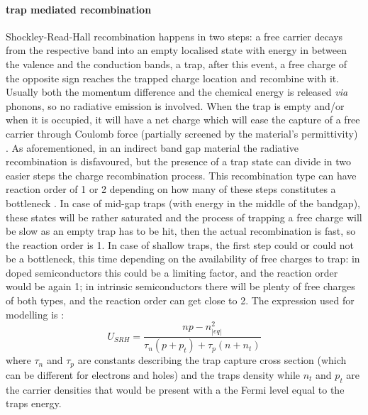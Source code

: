 		\paragraph{ trap mediated recombination}
		Shockley-Read-Hall recombination \cite{Shockley1952} happens in two steps: a free carrier decays from the respective band into an empty localised state with energy in between the valence and the conduction bands, a trap, after this event, a free charge of the opposite sign reaches the trapped charge location and recombine with it.
		Usually both the momentum difference and the chemical energy is released \textsl{via} phonons, so no radiative emission is involved.
		When the trap is empty and/or when it is occupied, it will have a net charge which will ease the capture of a free carrier through Coulomb force (partially screened by the material's permittivity) \cite{Kirchartz2018,Kirchartz2019}.
		As aforementioned, in an indirect band gap material the radiative recombination is disfavoured, but the presence of a trap state can divide in two easier steps the charge recombination process.
		This recombination type can have reaction order of 1 or 2 depending on how many of these steps constitutes a bottleneck \cite{Calado2019}.
		In case of mid-gap traps (with energy in the middle of the bandgap), these states will be rather saturated and the process of trapping a free charge will be slow as an empty trap has to be hit, then the actual recombination is fast, so the reaction order is 1.
		In case of shallow traps, the first step could or could not be a bottleneck, this time depending on the availability of free charges to trap: in doped semiconductors this could be a limiting factor, and the reaction order would be again 1; in intrinsic semiconductors there will be plenty of free charges of both types, and the reaction order can get close to 2.
		The expression used for modelling is \cite{Shockley1952,Nelson2003}:
		\begin{equation}\label{eq:srh}
			U_{SRH} = \frac{np-n_|eq|^2}{\tau_n(p+p_t)+ \tau_p(n+n_t)}
		\end{equation}
		where $\tau_n$ and $\tau_p$ are constants describing the trap capture cross section (which can be different for electrons and holes) and the traps density while $n_t$ and $p_t$ are the carrier densities that would be present with a the Fermi level equal to the traps energy.
